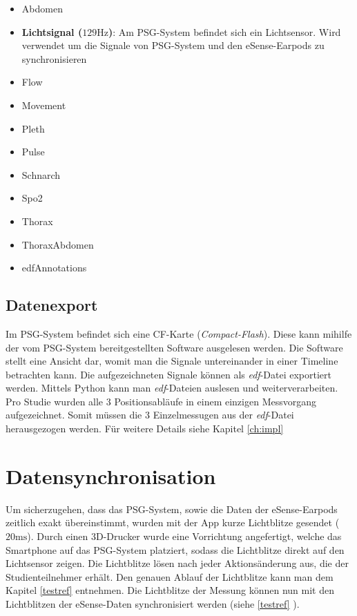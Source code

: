 \begin{itemize}
    \item Abdomen
    \item \textbf{Lichtsignal ($129 \si{\hertz}$)}: Am PSG-System befindet sich ein Lichtsensor. Wird verwendet um die Signale von PSG-System und den eSense-Earpods zu synchronisieren
    \item Flow
    \item Movement
    \item Pleth
    \item Pulse
    \item Schnarch
    \item Spo2
    \item Thorax
    \item ThoraxAbdomen
    \item edfAnnotations
\end{itemize}

\subsection{Datenexport}
\label{ch:sa:psg:export}

Im PSG-System befindet sich eine CF-Karte (\textit{Compact-Flash}). Diese kann mihilfe der vom PSG-System bereitgestellten Software \glqq {}\grqq ausgelesen werden.
Die Software stellt eine Ansicht dar, womit man die Signale untereinander in einer Timeline betrachten kann. Die aufgezeichneten Signale können als \textit{edf}-Datei exportiert werden.
Mittels Python kann man \textit{edf}-Dateien auslesen und weiterverarbeiten.
Pro Studie wurden alle 3 Positionsabläufe in einem einzigen Messvorgang aufgezeichnet. Somit müssen die 3 Einzelmessugen aus der \textit{edf}-Datei herausgezogen werden.
Für weitere Details siehe Kapitel \ref{ch:impl} 

\section{Datensynchronisation}
\label{ch:sa:data_synchronisation}
Um sicherzugehen, dass das PSG-System, sowie die Daten der eSense-Earpods zeitlich exakt übereinstimmt, wurden mit der App kurze Lichtblitze gesendet ($20 \si{\ms}$).
Durch einen 3D-Drucker wurde eine Vorrichtung angefertigt, welche das Smartphone auf das PSG-System platziert, sodass die Lichtblitze direkt auf den Lichtsensor zeigen.
Die Lichtblitze lösen nach jeder Aktionsänderung aus, die der Studienteilnehmer erhält. 
Den genauen Ablauf der Lichtblitze kann man dem Kapitel \ref{testref} entnehmen.
Die Lichtblitze der Messung können nun mit den Lichtblitzen der eSense-Daten synchronisiert werden (siehe \ref{testref} ).

